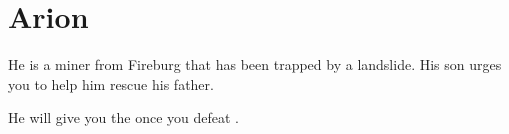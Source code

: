 \section{Arion}
\label{char:arion}


He is a miner from Fireburg that has been trapped by a landslide. His son  urges you to help him rescue his father.

He will give you the  once you defeat .

